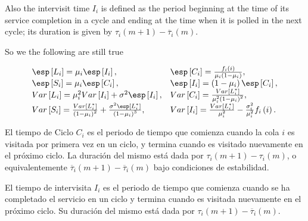 %
%

Also the intervisit time $I_{i}$ is defined as the period beginning at the time of its service completion in a cycle and ending at the time when it is polled in the next cycle; its duration is given by $\tau_{i}\left(m+1\right)-\overline{\tau}_{i}\left(m\right)$.

So we the following are still true 

\begin{eqnarray}
\begin{array}{ll}
\esp\left[L_{i}\right]=\mu_{i}\esp\left[I_{i}\right], &
\esp\left[C_{i}\right]=\frac{f_{i}\left(i\right)}{\mu_{i}\left(1-\mu_{i}\right)},\\
\esp\left[S_{i}\right]=\mu_{i}\esp\left[C_{i}\right],&
\esp\left[I_{i}\right]=\left(1-\mu_{i}\right)\esp\left[C_{i}\right],\\
Var\left[L_{i}\right]= \mu_{i}^{2}Var\left[I_{i}\right]+\sigma^{2}\esp\left[I_{i}\right],& 
Var\left[C_{i}\right]=\frac{Var\left[L_{i}^{*}\right]}{\mu_{i}^{2}\left(1-\mu_{i}\right)^{2}},\\
Var\left[S_{i}\right]= \frac{Var\left[L_{i}^{*}\right]}{\left(1-\mu_{i}\right)^{2}}+\frac{\sigma^{2}\esp\left[L_{i}^{*}\right]}{\left(1-\mu_{i}\right)^{3}},&
Var\left[I_{i}\right]= \frac{Var\left[L_{i}^{*}\right]}{\mu_{i}^{2}}-\frac{\sigma_{i}^{2}}{\mu_{i}^{2}}f_{i}\left(i\right).
\end{array}
\end{eqnarray}
\begin{Def}
El tiempo de Ciclo $C_{i}$ es el periodo de tiempo que comienza cuando la cola $i$ es visitada por primera vez en un ciclo, y termina cuando es visitado nuevamente en el pr\'oximo ciclo. La duraci\'on del mismo est\'a dada por $\tau_{i}\left(m+1\right)-\tau_{i}\left(m\right)$, o equivalentemente $\overline{\tau}_{i}\left(m+1\right)-\overline{\tau}_{i}\left(m\right)$ bajo condiciones de estabilidad.
\end{Def}


\begin{Def}
El tiempo de intervisita $I_{i}$ es el periodo de tiempo que comienza cuando se ha completado el servicio en un ciclo y termina cuando es visitada nuevamente en el pr\'oximo ciclo. Su  duraci\'on del mismo est\'a dada por $\tau_{i}\left(m+1\right)-\overline{\tau}_{i}\left(m\right)$.
\end{Def}

